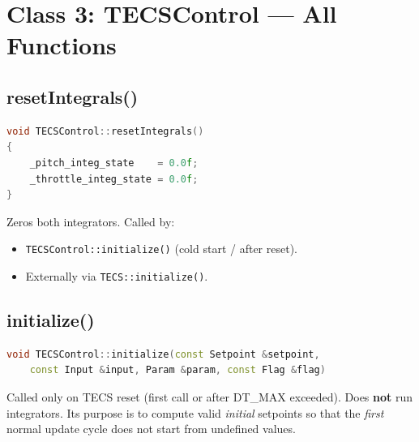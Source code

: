 \documentclass[12pt,a4paper]{article}
\begin{document}
\section{Class 3: TECSControl --- All Functions}

\subsection{resetIntegrals()}

\begin{lstlisting}[language=C++]
void TECSControl::resetIntegrals()
{
    _pitch_integ_state    = 0.0f;
    _throttle_integ_state = 0.0f;
}
\end{lstlisting}

Zeros both integrators. Called by:
\begin{itemize}
  \item \texttt{TECSControl::initialize()} (cold start / after reset).
  \item Externally via \texttt{TECS::initialize()}.
\end{itemize}

\subsection{initialize()}

\begin{lstlisting}[language=C++]
void TECSControl::initialize(const Setpoint &setpoint,
    const Input &input, Param &param, const Flag &flag)
\end{lstlisting}

Called only on TECS reset (first call or after DT\_MAX exceeded).
Does \textbf{not} run integrators. Its purpose is to compute valid
\emph{initial} setpoints so that the \emph{first} normal update cycle
does not start from undefined values.
\end{document}
